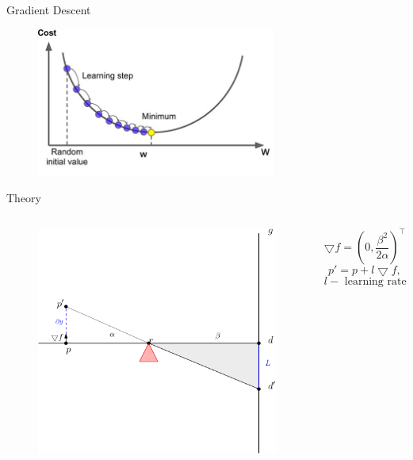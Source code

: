 \documentclass{beamer}
\begin{document}
\begin{frame}{Gradient Descent}
	\begin{figure}
		\centering
		\includegraphics[width = 0.7\textwidth]{Images/external-content.duckduckgo.com.jpeg}
	\end{figure}
\end{frame}

\begin{frame}{Theory}
		\begin{columns}[T, onlytextwidth] %
			\begin{figure}
				\includegraphics[width = \textwidth]{Images/gradient2.png}
			\end{figure}

			\centering
			$$\bigtriangledown f = (0, \frac{\beta^2}{2\alpha})^\intercal$$
			$$p' = p + l\bigtriangledown f,$$
			$$l - \text{ learning rate}$$
	\end{columns}
\end{frame}
\end{document}
